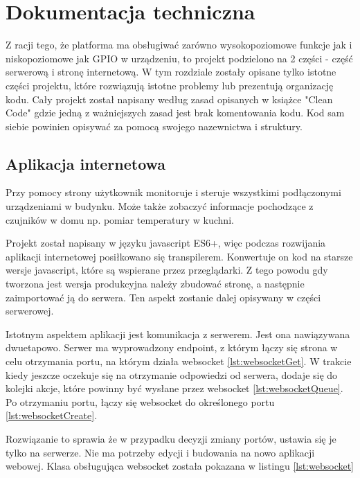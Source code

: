 \chapter{Dokumentacja techniczna}%
Z racji tego, że platforma ma obsługiwać zarówno wysokopoziomowe funkcje jak i niskopoziomowe jak GPIO w urządzeniu, to projekt podzielono na 2 części - część serwerową i stronę internetową. W tym rozdziale zostały opisane tylko istotne  części projektu, które rozwiązują istotne problemy lub prezentują organizację kodu. Cały projekt został napisany według zasad opisanych w książce "Clean Code" gdzie jedną z ważniejszych zasad jest brak komentowania kodu. Kod sam siebie powinien opisywać za pomocą swojego nazewnictwa i struktury.  \cite{cleancode}
\section{Aplikacja internetowa}
Przy pomocy strony użytkownik monitoruje i steruje wszystkimi podłączonymi urządzeniami w budynku. Może także zobaczyć informacje pochodzące z czujników w domu np. pomiar temperatury w kuchni. \par
Projekt został napisany w języku javascript ES6+, więc podczas rozwijania aplikacji internetowej posiłkowano się transpilerem. Konwertuje on kod na starsze wersje javascript, które są wspierane przez przeglądarki. Z tego powodu gdy tworzona jest  wersja produkcyjna należy zbudować stronę, a następnie zaimportować ją do serwera. Ten aspekt zostanie dalej opisywany w części serwerowej.
\par Istotnym aspektem aplikacji jest komunikacja z serwerem. Jest ona nawiązywana dwuetapowo.
Serwer ma wyprowadzony endpoint, z którym łączy się strona w celu otrzymania portu, na którym działa websocket
\ref{lst:websocketGet}. W trakcie kiedy jeszcze oczekuje się na otrzymanie odpowiedzi od serwera, dodaje się do kolejki akcje, które powinny być wysłane przez websocket \ref{lst:websocketQueue}. Po otrzymaniu portu, łączy się websocket do określonego portu \ref{lst:websocketCreate}. 
\par Rozwiązanie to sprawia że w przypadku decyzji zmiany portów, ustawia się je tylko na serwerze. Nie ma potrzeby edycji i budowania na nowo aplikacji webowej. Klasa obsługująca websocket została pokazana w listingu \ref{lst:websocket}
\newpage
